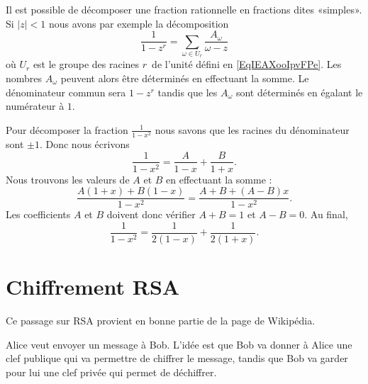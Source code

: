 Il est possible de décomposer une fraction rationnelle en fractions dites «simples». Si \( | z |<1\) nous avons par exemple la décomposition
\begin{equation}        \label{EqDWYBooJIMBAt}
	\frac{1}{ 1-z^r }=\sum_{\omega\in U_r}\frac{ A_{\omega} }{ \omega-z }
\end{equation}
où \( U_r\) est le groupe des racines \( r\)\ieme\ de l'unité défini en \eqref{EqIEAXooIpvFPe}. Les nombres \( A_{\omega}\) peuvent alors être déterminés en effectuant la somme. Le dénominateur commun sera \( 1-z^r\) tandis que les \( A_{\omega}\) sont déterminés en égalant le numérateur à \( 1\).

\begin{example}
	Pour décomposer la fraction \( \frac{1}{ 1-x^2 }\) nous savons que les racines du dénominateur sont \( \pm 1\). Donc nous écrivons
	\begin{equation}
		\frac{1}{ 1-x^2 }=\frac{ A }{ 1-x }+\frac{ B }{ 1+x }.
	\end{equation}
	Nous trouvons les valeurs de \( A\) et \( B\) en effectuant la somme :
	\begin{equation}
		\frac{ A(1+x)+B(1-x) }{ 1-x^2 }=\frac{ A+B+(A-B)x }{ 1-x^2 }.
	\end{equation}
	Les coefficients \( A\) et \( B\) doivent donc vérifier \( A+B=1\) et \( A-B=0\). Au final,
	\begin{equation}
		\frac{1}{ 1-x^2 }=\frac{1}{ 2(1-x) }+\frac{1}{ 2(1+x) }.
	\end{equation}
\end{example}

\section{Chiffrement RSA}
\label{SecEVaFYi}

Ce passage sur RSA provient en bonne partie de la page de Wikipédia\cite{ooRIFDooNxOehF}.

Alice veut envoyer un message à Bob. L'idée est que Bob va donner à Alice une clef publique qui va permettre de chiffrer le message, tandis que Bob va garder pour lui une clef privée qui permet de déchiffrer.

